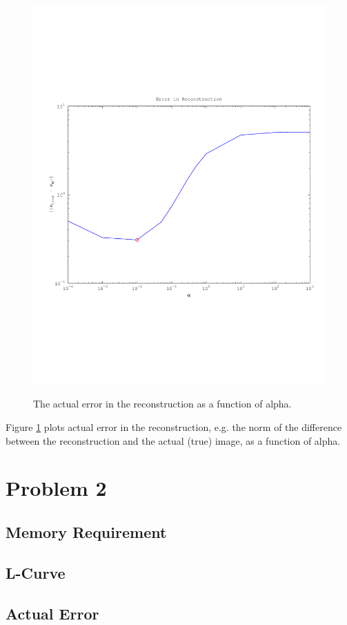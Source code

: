 \documentclass{article}
\begin{document}
\begin{figure}[!htb]
  \includegraphics[scale=.5]{plots/true1d.pdf}
  \label{fig:data}
  \caption{The actual error in the reconstruction as a function of
 alpha. } 
 \label{fig:actual}
\end{figure}

Figure \ref{fig:actual} plots actual error in the reconstruction,
e.g. the norm of the difference between the reconstruction and the
actual (true) image, as a function of alpha. 


\newpage
\section{Problem 2}


\subsection{Memory Requirement}


\subsection{L-Curve}


\subsection{Actual Error}
\end{document}
